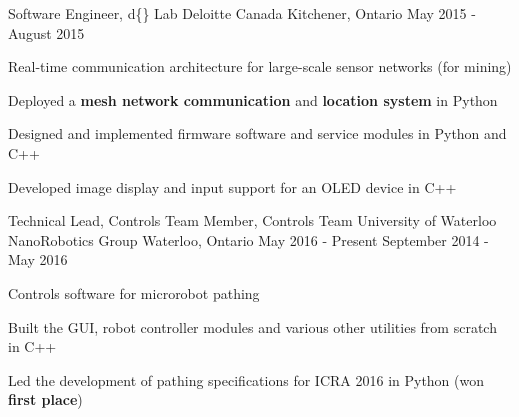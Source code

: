 \begin{cventries}

\cventry
{Software Engineer, d\{\} Lab}
{Deloitte Canada} %
{Kitchener, Ontario} %
{May 2015 - August 2015} %
{
Real-time communication architecture for large-scale sensor networks (for mining)
\begin{cvitems}
\item[]
\item {Deployed a \textbf{mesh network communication} and \textbf{location system} in Python}
\item {Designed and implemented firmware software and service modules in Python and C++}
\item {Developed image display and input support for an OLED device in C++}
\end{cvitems}
}


\cventry
{Technical Lead, Controls Team \newline {\vspace{-.75mm}}
Member, Controls Team}
{University of Waterloo NanoRobotics Group}
{Waterloo, Ontario}
{May 2016 - Present \newline {\vspace{-1mm}}
September 2014 - May 2016} %
{ %
Controls software for microrobot pathing
\begin{cvitems}
\item[]
\item {Built the GUI, robot controller modules and various other utilities from scratch in C++}
\item {Led the development of pathing specifications for ICRA 2016 in Python (won \textbf{first place})}
\end{cvitems} 
}


\end{cventries}
